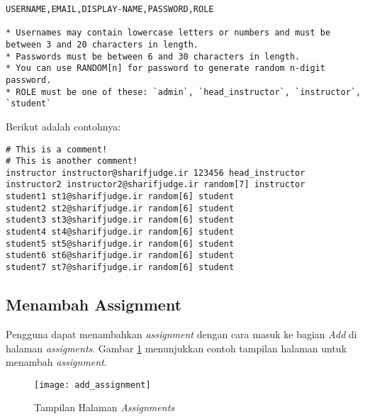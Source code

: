 \begin{lstlisting}[basicstyle=\ttfamily, frame=single,
columns=fullflexible, keepspaces=true, breaklines=true, label=ls:4]
USERNAME,EMAIL,DISPLAY-NAME,PASSWORD,ROLE

* Usernames may contain lowercase letters or numbers and must be between 3 and 20 characters in length.
* Passwords must be between 6 and 30 characters in length.
* You can use RANDOM[n] for password to generate random n-digit password.
* ROLE must be one of these: `admin`, `head_instructor`, `instructor`, `student`
\end{lstlisting}

Berikut adalah contohnya:
\begin{lstlisting}[basicstyle=\ttfamily, frame=single,
columns=fullflexible, keepspaces=true, breaklines=true, label=ls:5]
# This is a comment!
# This is another comment!
instructor instructor@sharifjudge.ir 123456 head_instructor
instructor2 instructor2@sharifjudge.ir random[7] instructor
student1 st1@sharifjudge.ir random[6] student
student2 st2@sharifjudge.ir random[6] student
student3 st3@sharifjudge.ir random[6] student
student4 st4@sharifjudge.ir random[6] student
student5 st5@sharifjudge.ir random[6] student
student6 st6@sharifjudge.ir random[6] student
student7 st7@sharifjudge.ir random[6] student
\end{lstlisting}

\subsection{Menambah Assignment}
\label{sec:add_assignment}
Pengguna dapat menambahkan \textit{assignment} dengan cara masuk ke bagian \textit{Add} di halaman \textit{assigments}. Gambar \ref{fig:add_assignment} menunjukkan contoh tampilan halaman untuk menambah \textit{assignment}.

\begin{figure}[H]
	\centering  
	\texttt{[image: add\_assignment]}  
	\caption[Tampilan Halaman \textit{Assignments}]{Tampilan Halaman \textit{Assignments}} 
	\label{fig:add_assignment} 
\end{figure} 

